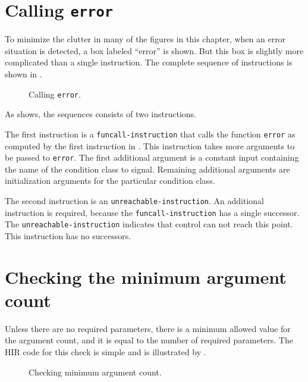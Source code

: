 \section{Calling \texttt{error}}

To minimize the clutter in many of the figures in this chapter, when
an error situation is detected, a box labeled ``error'' is shown.  But
this box is slightly more complicated than a single instruction.  The
complete sequence of instructions is shown in
.


\begin{figure}
\begin{center}
\end{center}
\caption{\label{fig-call-error}
Calling \texttt{error}.}
\end{figure}

As  shows, the sequences consists of two
instructions.

The first instruction is a \texttt{funcall-instruction} that calls the
function \texttt{error} as computed by the first instruction in
.  This instruction takes more arguments
to be passed to \texttt{error}.  The first additional argument is a
constant input containing the name of the condition class to signal.
Remaining additional arguments are initialization arguments for the
particular condition class.

The second instruction is an \texttt{unreachable-instruction}.  An
additional instruction is required, because the
\texttt{funcall-instruction} has a single successor.  The
\texttt{unreachable-instruction} indicates that control can not reach
this point.  This instruction has no successors.

\section{Checking the minimum argument count}

Unless there are no required parameters, there is a minimum allowed
value for the argument count, and it is equal to the number of
required parameters.  The HIR code for this check is simple and is
illustrated by .

\begin{figure}
\begin{center}
\end{center}
\caption{\label{fig-check-minimum-argument-count}
Checking minimum argument count.}
\end{figure}

